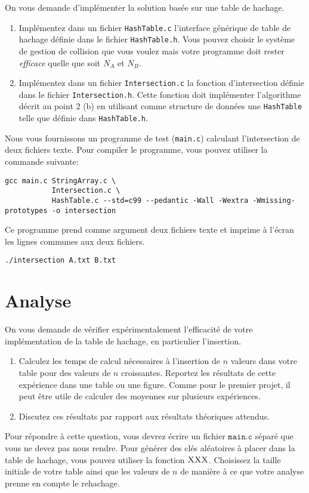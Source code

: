 \documentclass[a4paper,10pt]{article}
\begin{document}
On vous demande d'implémenter la solution basée sur une table de
hachage.

\begin{enumerate}
\item Implémentez dans un fichier \texttt{HashTable.c} l'interface générique de table de hachage définie dans le fichier \texttt{HashTable.h}.
  Vous pouvez choisir le système de gestion de collision
  que vous voulez mais votre programme doit rester {\it efficace} quelle
  que soit $N_A$ et $N_B$.
\item Implémentez dans un fichier \texttt{Intersection.c} la fonction d'intersection définie dans le fichier \texttt{Intersection.h}. Cette fonction doit implémenter l'algorithme décrit au point 2 (b) en utilisant comme structure de données une \texttt{HashTable} telle que définie dans \texttt{HashTable.h}.
\end{enumerate}

Nous vous fournissons un programme de test (\texttt{main.c}) calculant l'intersection de deux fichiers texte.
Pour compiler le programme, vous pouvez utiliser la commande suivante:

\begin{verbatim}
gcc main.c StringArray.c \
           Intersection.c \
           HashTable.c --std=c99 --pedantic -Wall -Wextra -Wmissing-prototypes -o intersection
\end{verbatim}

Ce programme prend comme argument deux fichiers texte et imprime à l'écran les lignes communes aux deux fichiers.

\begin{verbatim}
./intersection A.txt B.txt
\end{verbatim}

\section{Analyse}

On vous demande de vérifier expérimentalement l'efficacité de votre
implémentation de la table de hachage, en particulier l'insertion.
\begin{enumerate}
\item Calculez les temps de calcul nécessaires à l'insertion de $n$
  valeurs dans votre table pour des valeurs de $n$
  croissantes. Reportez les résultats de cette expérience dans une
  table ou une figure. Comme pour le premier projet, il peut être
  utile de calculer des moyennes sur plusieurs expériences.
\item Discutez ces résultats par rapport aux résultats théoriques attendus.
\end{enumerate}

Pour répondre à cette question, vous devrez écrire un fichier
$\texttt{main.c}$ séparé que vous ne devez pas nous rendre. Pour
générer des clés aléatoires à placer dans la table de hachage, vous
pouvez utiliser la fonction $\textnormal{\scshape XXX}$. Choisissez la taille
initiale de votre table ainsi que les valeurs de $n$ de manière à ce
que votre analyse prenne en compte le rehachage.
\end{document}
